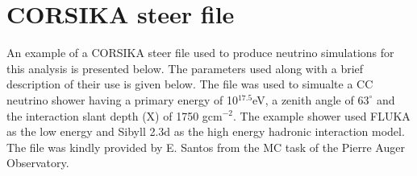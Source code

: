 \chapter{CORSIKA steer file}
\label{sec:app_1}
An example of a CORSIKA steer file used to produce neutrino simulations for this analysis is presented below. The parameters used along with a brief description of their use is given below. The file was used to simualte a CC neutrino shower having a primary energy of 10$^{17.5}$eV, a zenith angle of $63^\circ$ and the interaction slant depth (X) of 1750 gcm$^{-2}$. The example shower used FLUKA as the low energy and Sibyll 2.3d as the high energy hadronic interaction model. The file was kindly provided by E. Santos from the MC task of the Pierre Auger Observatory.

